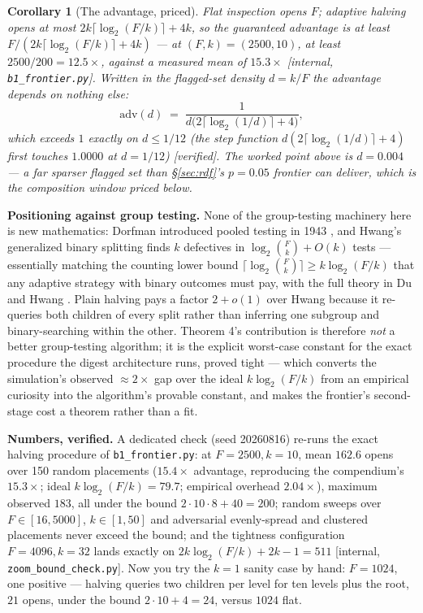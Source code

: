 \documentclass[11pt,a4paper]{article}
\newtheorem{corollary}{Corollary}
\begin{document}
\begin{corollary}[The advantage, priced]
Flat inspection opens $F$; adaptive halving opens at most $2k\lceil\log_2(F/k)\rceil+4k$, so the guaranteed advantage is at least $F/(2k\lceil\log_2(F/k)\rceil+4k)$ --- at $(F,k)=(2500,10)$, at least $2500/200=12.5\times$, against a measured mean of $15.3\times$ [internal, \texttt{b1\_frontier.py}]. Written in the flagged-set density $d=k/F$ the advantage depends on nothing else:
\[
\mathrm{adv}(d)\;=\;\frac{1}{d\bigl(2\lceil\log_2(1/d)\rceil+4\bigr)},
\]
which exceeds $1$ exactly on $d\le 1/12$ (the step function $d(2\lceil\log_2(1/d)\rceil+4)$ first touches $1.0000$ at $d=1/12$) [verified]. The worked point above is $d{=}0.004$ --- a far sparser flagged set than \S\ref{sec:rdf}'s $p{=}0.05$ frontier can deliver, which is the composition window priced below.
\end{corollary}

\textbf{Positioning against group testing.} None of the group-testing machinery here is new mathematics: Dorfman introduced pooled testing in 1943 \cite{dorfman}, and Hwang's generalized binary splitting \cite{hwang} finds $k$ defectives in $\log_2\binom{F}{k}+O(k)$ tests --- essentially matching the counting lower bound $\lceil\log_2\binom{F}{k}\rceil\ge k\log_2(F/k)$ that any adaptive strategy with binary outcomes must pay, with the full theory in Du and Hwang \cite{duhwang}. Plain halving pays a factor $2+o(1)$ over Hwang because it re-queries both children of every split rather than inferring one subgroup and binary-searching within the other. Theorem 4's contribution is therefore \emph{not} a better group-testing algorithm; it is the explicit worst-case constant for the exact procedure the digest architecture runs, proved tight --- which converts the simulation's observed $\approx 2\times$ gap over the ideal $k\log_2(F/k)$ from an empirical curiosity into the algorithm's provable constant, and makes the frontier's second-stage cost a theorem rather than a fit.

\textbf{Numbers, verified.} A dedicated check (seed 20260816) re-runs the exact halving procedure of \texttt{b1\_frontier.py}: at $F{=}2500,k{=}10$, mean $162.6$ opens over 150 random placements ($15.4\times$ advantage, reproducing the compendium's $15.3\times$; ideal $k\log_2(F/k)=79.7$; empirical overhead $2.04\times$), maximum observed $183$, all under the bound $2\cdot10\cdot8+40=200$; random sweeps over $F\in[16,5000]$, $k\in[1,50]$ and adversarial evenly-spread and clustered placements never exceed the bound; and the tightness configuration $F{=}4096,k{=}32$ lands exactly on $2k\log_2(F/k)+2k-1=511$ [internal, \texttt{zoom\_bound\_check.py}]. Now you try the $k=1$ sanity case by hand: $F=1024$, one positive --- halving queries two children per level for ten levels plus the root, $21$ opens, under the bound $2\cdot10+4=24$, versus $1024$ flat.
\end{document}

